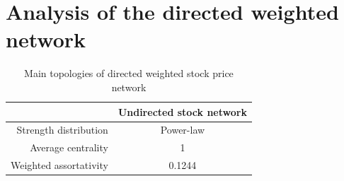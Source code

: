 \section{Analysis of the directed weighted network}
\begin{table}
	\begin{center}
		\begin{tabular}{|r|c|}\hline\hline
			&Undirected stock network\\\hline
			Strength distribution&Power-law\\
			Average centrality&1\\
			Weighted assortativity&0.1244\\
			\hline\hline
		\end{tabular}
	\end{center}
	\caption{Main topologies of directed weighted stock price network}\label{tab:weighted}
\end{table}

